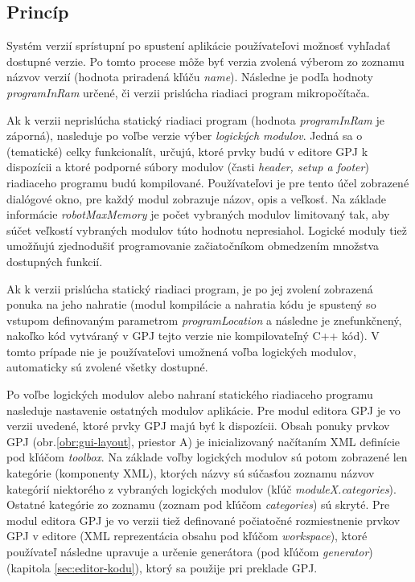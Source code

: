 \subsection{Princíp}
Systém verzií sprístupní po spustení aplikácie používateľovi možnosť vyhľadať dostupné verzie. Po tomto procese môže byť verzia zvolená výberom zo zoznamu názvov verzií (hodnota priradená kľúču \textit{name}). Následne je podľa hodnoty \textit{programInRam} určené, či verzii prislúcha  riadiaci program mikropočítača.
	
Ak k verzii neprislúcha statický riadiaci program (hodnota \textit{programInRam} je záporná), nasleduje po voľbe verzie výber \textit{logických modulov}.
Jedná sa o (tematické) celky funkcionalít, určujú, ktoré prvky budú v editore GPJ k dispozícii a ktoré podporné súbory modulov (časti \textit{header, setup a footer}) riadiaceho programu budú kompilované. Používateľovi je pre tento účel zobrazené dialógové okno, pre každý modul zobrazuje názov, opis a veľkosť. Na základe informácie \textit{robotMaxMemory} je počet vybraných modulov limitovaný tak, aby súčet veľkostí vybraných modulov túto hodnotu nepresiahol. Logické moduly tiež umožňujú zjednodušiť programovanie začiatočníkom obmedzením množstva dostupných funkcií.

Ak k verzii prislúcha statický riadiaci program, je po jej zvolení zobrazená ponuka na jeho nahratie (modul kompilácie a nahratia kódu je spustený so vstupom definovaným parametrom \textit{programLocation} a následne je znefunkčnený, nakoľko kód vytváraný v GPJ tejto verzie nie kompilovateľný C++ kód). V tomto prípade nie je používateľovi umožnená voľba logických modulov, automaticky sú zvolené všetky dostupné.

Po voľbe logických modulov alebo nahraní statického riadiaceho programu nasleduje nastavenie ostatných modulov aplikácie. Pre modul editora GPJ je vo verzii uvedené, ktoré prvky GPJ majú byť k dispozícii. Obsah ponuky prvkov GPJ (obr.\ref{obr:gui-layout}, priestor A) je inicializovaný načítaním XML definície pod kľúčom \textit{toolbox}. Na základe voľby logických modulov sú potom zobrazené len kategórie (komponenty XML), ktorých názvy sú súčasťou zoznamu názvov kategórií niektorého z vybraných logických modulov (kľúč \textit{moduleX.categories}). Ostatné kategórie zo zoznamu (zoznam pod kľúčom \textit{categories}) sú skryté. Pre modul editora GPJ je vo verzii tiež definované počiatočné rozmiestnenie prvkov GPJ v editore (XML reprezentácia obsahu pod kľúčom \textit{workspace}), ktoré používateľ následne upravuje a určenie generátora (pod kľúčom \textit{generator}) (kapitola \ref{sec:editor-kodu}), ktorý sa použije pri preklade GPJ.

